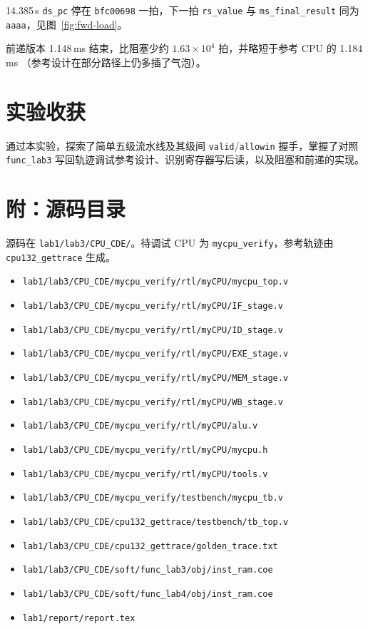 \documentclass{article}
\begin{document}
14.385\,\textmu s \texttt{ds\_pc} 停在 \texttt{bfc00698} 一拍，下一拍 \texttt{rs\_value} 与
\texttt{ms\_final\_result} 同为 \texttt{aaaa}，见图~\ref{fig:fwd-load}。

前递版本 1.148\,ms 结束，比阻塞少约 $1.63\times 10^{4}$ 拍，并略短于参考 CPU 的 1.184\,ms
（参考设计在部分路径上仍多插了气泡）。

\section{实验收获}
通过本实验，探索了简单五级流水线及其级间 \texttt{valid}/\texttt{allowin} 握手，掌握了对照 \texttt{func\_lab3} 写回轨迹调试参考设计、识别寄存器写后读，以及阻塞和前递的实现。

\section{附：源码目录}
源码在 \verb|lab1/lab3/CPU_CDE/|。待调试 CPU 为 \verb|mycpu_verify|，参考轨迹由 \verb|cpu132_gettrace| 生成。
\begin{itemize}
\item \verb|lab1/lab3/CPU_CDE/mycpu_verify/rtl/myCPU/mycpu_top.v|
\item \verb|lab1/lab3/CPU_CDE/mycpu_verify/rtl/myCPU/IF_stage.v|
\item \verb|lab1/lab3/CPU_CDE/mycpu_verify/rtl/myCPU/ID_stage.v|
\item \verb|lab1/lab3/CPU_CDE/mycpu_verify/rtl/myCPU/EXE_stage.v|
\item \verb|lab1/lab3/CPU_CDE/mycpu_verify/rtl/myCPU/MEM_stage.v|
\item \verb|lab1/lab3/CPU_CDE/mycpu_verify/rtl/myCPU/WB_stage.v|
\item \verb|lab1/lab3/CPU_CDE/mycpu_verify/rtl/myCPU/alu.v|
\item \verb|lab1/lab3/CPU_CDE/mycpu_verify/rtl/myCPU/mycpu.h|
\item \verb|lab1/lab3/CPU_CDE/mycpu_verify/rtl/myCPU/tools.v|
\item \verb|lab1/lab3/CPU_CDE/mycpu_verify/testbench/mycpu_tb.v|
\item \verb|lab1/lab3/CPU_CDE/cpu132_gettrace/testbench/tb_top.v|
\item \verb|lab1/lab3/CPU_CDE/cpu132_gettrace/golden_trace.txt|
\item \verb|lab1/lab3/CPU_CDE/soft/func_lab3/obj/inst_ram.coe|
\item \verb|lab1/lab3/CPU_CDE/soft/func_lab4/obj/inst_ram.coe|
\item \verb|lab1/report/report.tex|
\end{itemize}
\end{document}
